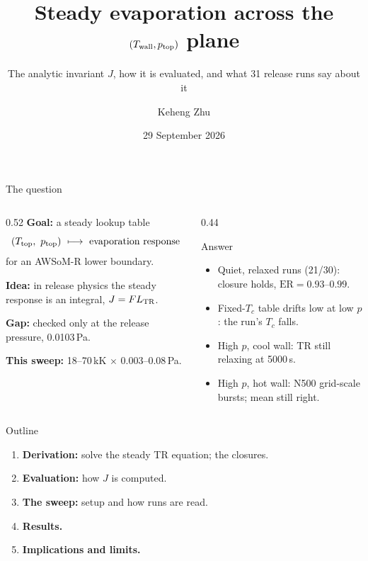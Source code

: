 \documentclass[aspectratio=169,10pt]{beamer}
\title[The $(T,p)$ evaporation sweep]{Steady evaporation across the
       $(\Twall,\ptop)$ plane}
\subtitle{The analytic invariant $J$, how it is evaluated, and what 31 release
          runs say about it}
\author{Keheng Zhu}
\institute{University of Michigan}
\date{29 September 2026}
\newcommand{\ptop}{p_{\rm top}}
\newcommand{\Ttop}{T_{\rm top}}
\newcommand{\LTR}{L_{\rm TR}}
\newcommand{\ER}{\mathrm{ER}}
\begin{document}
\begin{frame}
  \titlepage
\end{frame}

\begin{frame}{The question}
  \begin{columns}[T]
    \begin{column}{0.52\textwidth}
      \small
      \textbf{Goal:} a steady lookup table
      \[
        (\Ttop,\ \ptop) \ \longmapsto\ \text{evaporation response}
      \]
      for an AWSoM-R lower boundary.
      \vspace{8pt}

      \textbf{Idea:} in release physics the steady response is an integral,
      $J = F\LTR$.
      \vspace{8pt}

      \textbf{Gap:} checked only at the release pressure, 0.0103\,Pa.
      \vspace{8pt}

      \textbf{This sweep:} 18--70\,kK $\times$ 0.003--0.08\,Pa.
    \end{column}
    \begin{column}{0.44\textwidth}
      \begin{block}{Answer}
        \small
        \begin{itemize}\itemsep5pt
          \item Quiet, relaxed runs (21/30): closure holds,
                $\ER = 0.93$--$0.99$.
          \item Fixed-$T_c$ table drifts low at low $p$: the run's $T_c$
                falls.
          \item High $p$, cool wall: TR still relaxing at 5000\,s.
          \item High $p$, hot wall: N500 grid-scale bursts; mean still right.
        \end{itemize}
      \end{block}
    \end{column}
  \end{columns}
\end{frame}

\begin{frame}{Outline}
  \vfill
  \begin{enumerate}\itemsep10pt
    \item \textbf{Derivation:} solve the steady TR equation; the closures.
    \item \textbf{Evaluation:} how $J$ is computed.
    \item \textbf{The sweep:} setup and how runs are read.
    \item \textbf{Results.}
    \item \textbf{Implications and limits.}
  \end{enumerate}
  \vfill
\end{frame}
\end{document}
